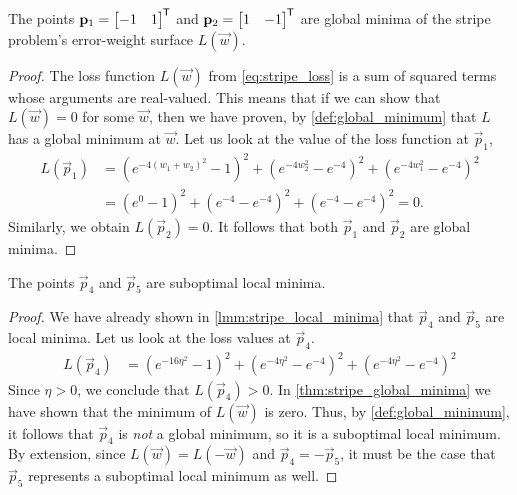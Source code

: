 \begin{theorem}
    \label{thm:stripe_global_minima}
    The points $\mathbf{p}_1=\begin{bmatrix}
        -1 & 1
    \end{bmatrix}^{\mkern-1.5mu\mathsf{T}}$ and $\mathbf{p}_2=\begin{bmatrix}
        1 & -1
    \end{bmatrix}^{\mkern-1.5mu\mathsf{T}}$ are global minima of the stripe problem's error-weight surface $L(\vec{w})$.
\end{theorem}
\begin{proof}
    The loss function $L(\vec{w})$ from \ref{eq:stripe_loss} is a sum of squared terms whose arguments are real-valued.
    This means that if we can show that $L(\vec{w})=0$ for some $\vec{w}$, then we have proven, by \ref{def:global_minimum} that $L$ has a global minimum at $\vec{w}$.
    Let us look at the value of the loss function at $\vec{p}_1$,
    \begin{align*}
        L(\vec{p}_1)
        &=\left(e^{-4(w_1 + w_2)^2} - 1\right)^2
        + \left(e^{-4w_2^2} - e^{-4}\right)^2
        + \left(e^{-4w_1^2} - e^{-4}\right)^2 \\
        &=\left(e^{0} - 1\right)^2
        + \left(e^{-4} - e^{-4}\right)^2
        + \left(e^{-4} - e^{-4}\right)^2 = 0.
    \end{align*}
    Similarly, we obtain $L(\vec{p}_2)=0$. It follows that both $\vec{p}_1$ and $\vec{p}_2$ are global minima.
\end{proof}
\begin{corollary}
    \label{col:stripe_suboptimal_local_minima}
    The points $\vec{p}_4$ and $\vec{p}_5$ are suboptimal local minima.
\end{corollary}
\begin{proof}
    We have already shown in \ref{lmm:stripe_local_minima} that $\vec{p}_4$ and $\vec{p}_5$ are local minima. 
    Let us look at the loss values at $\vec{p}_4$.
    \begin{align*}
        L(\vec{p}_4)
        &=\left(e^{-16\eta^2} - 1\right)^2
        + \left(e^{-4\eta^2} - e^{-4}\right)^2
        + \left(e^{-4\eta^2} - e^{-4}\right)^2
    \end{align*}
    Since $\eta > 0$, we conclude that $L(\vec{p}_4)>0$. 
    In \ref{thm:stripe_global_minima} we have shown that the minimum of $L(\vec{w})$ is zero.
    Thus, by \ref{def:global_minimum}, it follows that $\vec{p}_4$ is \textit{not} a global minimum, so it is a suboptimal local minimum.
    By extension, since $L(\vec{w})=L(-\vec{w})$ and $\vec{p}_4=-\vec{p}_5$, it must be the case that $\vec{p}_5$ represents a suboptimal local minimum as well.
\end{proof}

